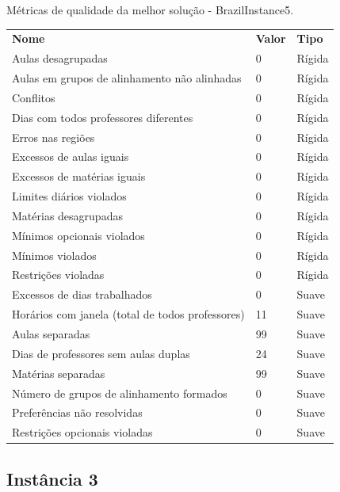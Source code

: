 \begin{quadro}[h]
	\centering
	\caption{Métricas de qualidade da melhor solução - BrazilInstance5.\label{qua:caracteristicas_horario_validacao_brazilinstance5}}
	\begin{tabular}{|p{8cm}|p{1cm}|p{3cm}|}
		\hline
		\textbf{Nome} & \textbf{Valor} & \textbf{Tipo} \\
		Aulas desagrupadas & 0 & Rígida \\
		\hline
		Aulas em grupos de alinhamento não alinhadas & 0 & Rígida \\
		\hline
		Conflitos & 0 & Rígida \\
		\hline
		Dias com todos professores diferentes & 0 & Rígida \\
		\hline
		Erros nas regiões & 0 & Rígida \\
		\hline
		Excessos de aulas iguais & 0 & Rígida \\
		\hline
		Excessos de matérias iguais & 0 & Rígida \\
		\hline
		Limites diários violados & 0 & Rígida \\
		\hline
		Matérias desagrupadas & 0 & Rígida \\
		\hline
		Mínimos opcionais violados & 0 & Rígida \\
		\hline
		Mínimos violados & 0 & Rígida \\
		\hline
		Restrições violadas & 0 & Rígida \\
		\hline
		Excessos de dias trabalhados & 0 & Suave \\
		\hline
		Horários com janela (total de todos professores) & 11 & Suave \\
		\hline
		Aulas separadas & 99 & Suave \\
		\hline
		Dias de professores sem aulas duplas & 24 & Suave \\
		\hline
		Matérias separadas & 99 & Suave \\
		\hline
		Número de grupos de alinhamento formados & 0 & Suave \\
		\hline
		Preferências não resolvidas & 0 & Suave \\
		\hline
		Restrições opcionais violadas & 0 & Suave \\
		\hline
	\end{tabular}
\end{quadro}

\clearpage
\subsection{Instância 3}

